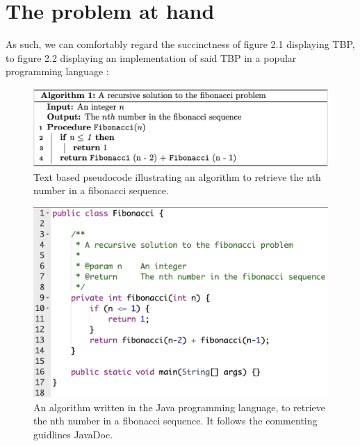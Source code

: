 \section{The problem at hand}

As such, we can comfortably regard the succinctness of figure 2.1 displaying TBP, to figure 2.2 displaying an implementation of said TBP in a popular programming language \cite{javaIsAPopularProgrammingLanguage}:

\begin{figure}[ht]
    \centering
    \includegraphics[scale=0.46]{assets/fibonacci_pseudo1.png}
    \caption{Text based pseudocode illustrating an algorithm to retrieve the nth number in a fibonacci sequence.}
    \label{fig:fibseq2}
\end{figure}

\begin{figure}[ht]
    \centering
    \includegraphics[scale=0.50]{assets/fibonacci_java.png}
    \caption[An algorithm written in the Java programming language, to retrieve the nth number in a fibonacci sequence.]{An algorithm written in the Java programming language, to retrieve the nth number in a fibonacci sequence. It follows the commenting guidlines JavaDoc\footnotemark.}
    \label{fig:fibjava}
\end{figure}


